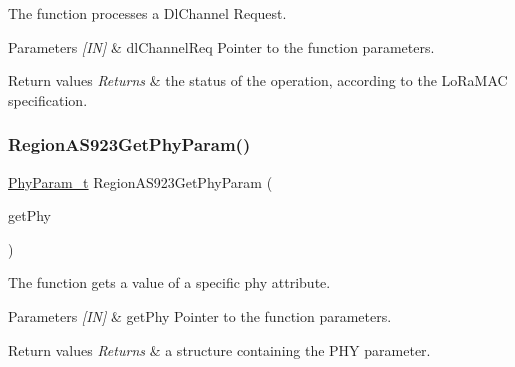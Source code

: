 The function processes a Dl\+Channel Request. 


\begin{DoxyParams}{Parameters}
{\em \mbox{[}\+I\+N\mbox{]}} & dl\+Channel\+Req Pointer to the function parameters.\\
\hline
\end{DoxyParams}

\begin{DoxyRetVals}{Return values}
{\em Returns} & the status of the operation, according to the Lo\+Ra\+M\+AC specification. \\
\hline
\end{DoxyRetVals}
\mbox{\label{group__REGIONAS923_ga20508dee35c0f25ff507478c5235fdeb}} 
\subsubsection{\texorpdfstring{Region\+A\+S923\+Get\+Phy\+Param()}{RegionAS923GetPhyParam()}}
{\footnotesize\ttfamily \hyperlink{group__REGION_gaed159b26e5c4677236b6e8677019db30}{Phy\+Param\+\_\+t} Region\+A\+S923\+Get\+Phy\+Param (\begin{DoxyParamCaption}\item[{\hyperlink{group__REGION_gab471483fff904f4f89bbc03f7fc380ab}{Get\+Phy\+Params\+\_\+t} $\ast$}]{get\+Phy }\end{DoxyParamCaption})}



The function gets a value of a specific phy attribute. 


\begin{DoxyParams}{Parameters}
{\em \mbox{[}\+I\+N\mbox{]}} & get\+Phy Pointer to the function parameters.\\
\hline
\end{DoxyParams}

\begin{DoxyRetVals}{Return values}
{\em Returns} & a structure containing the P\+HY parameter. \\
\hline
\end{DoxyRetVals}
\mbox{\label{group__REGIONAS923_ga24e0f9bd2b50e0a8efb5e3d5ecc12904}} 
